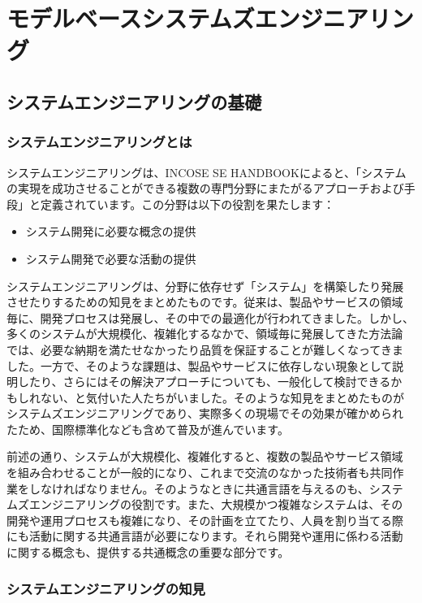 \chapter{モデルベースシステムズエンジニアリング}
\label{chap4}

\section{システムエンジニアリングの基礎}

\subsection{システムエンジニアリングとは}

システムエンジニアリングは、INCOSE SE HANDBOOKによると、「システムの実現を成功させることができる複数の専門分野にまたがるアプローチおよび手段」と定義されています。この分野は以下の役割を果たします：

\begin{itemize}
    \item システム開発に必要な概念の提供
    \item システム開発で必要な活動の提供
\end{itemize}

システムエンジニアリングは、分野に依存せず「システム」を構築したり発展
させたりするための知見をまとめたものです。従来は、製品やサービスの領域
毎に、開発プロセスは発展し、その中での最適化が行われてきました。しかし、
多くのシステムが大規模化、複雑化するなかで、領域毎に発展してきた方法論
では、必要な納期を満たせなかったり品質を保証することが難しくなってきま
した。一方で、そのような課題は、製品やサービスに依存しない現象として説
明したり、さらにはその解決アプローチについても、一般化して検討できるか
もしれない、と気付いた人たちがいました。そのような知見をまとめたものが
システムズエンジニアリングであり、実際多くの現場でその効果が確かめられ
たため、国際標準化なども含めて普及が進んでいます。

前述の通り、システムが大規模化、複雑化すると、複数の製品やサービス領域
を組み合わせることが一般的になり、これまで交流のなかった技術者も共同作
業をしなければなりません。そのようなときに共通言語を与えるのも、システ
ムズエンジニアリングの役割です。また、大規模かつ複雑なシステムは、その
開発や運用プロセスも複雑になり、その計画を立てたり、人員を割り当てる際
にも活動に関する共通言語が必要になります。それら開発や運用に係わる活動
に関する概念も、提供する共通概念の重要な部分です。

\subsection{システムエンジニアリングの知見}

